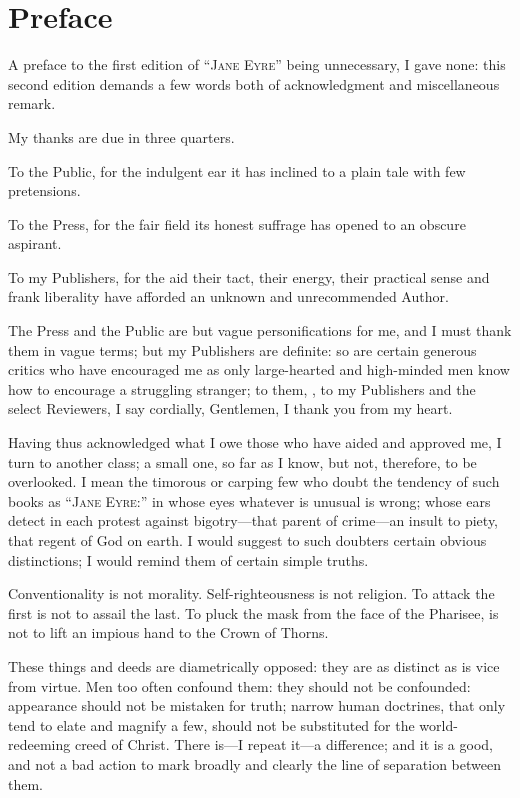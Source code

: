 \chapter{Preface}

A preface to the first edition of \enquote{\textsc{Jane Eyre}} being unnecessary,
I gave none: this second edition demands a few words both of
acknowledgment and miscellaneous remark.

My thanks are due in three quarters.

To the Public, for the indulgent ear it has inclined to a plain tale
with few pretensions.

To the Press, for the fair field its honest suffrage has opened to an
obscure aspirant.

To my Publishers, for the aid their tact, their energy, their practical
sense and frank liberality have afforded an unknown and unrecommended
Author.

The Press and the Public are but vague personifications for me, and I
must thank them in vague terms; but my Publishers are definite: so are
certain generous critics who have encouraged me as only large-hearted
and high-minded men know how to encourage a struggling stranger; to
them, \emph{\ie}, to my Publishers and the select Reviewers, I say
cordially, Gentlemen, I thank you from my heart.

Having thus acknowledged what I owe those who have aided and approved
me, I turn to another class; a small one, so far as I know, but not,
therefore, to be overlooked.  I mean the timorous or carping few who
doubt the tendency of such books as \enquote{\textsc{Jane Eyre:}} in whose eyes
whatever is unusual is wrong; whose ears detect in each protest against
bigotry---that parent of crime---an insult to piety, that regent of God
on earth.  I would suggest to such doubters certain obvious
distinctions; I would remind them of certain simple truths.

Conventionality is not morality.  Self-righteousness is not religion. 
To attack the first is not to assail the last.  To pluck the mask from
the face of the Pharisee, is not to lift an impious hand to the Crown of
Thorns.

These things and deeds are diametrically opposed: they are as distinct
as is vice from virtue.  Men too often confound them: they should not be
confounded: appearance should not be mistaken for truth; narrow human
doctrines, that only tend to elate and magnify a few, should not be
substituted for the world-redeeming creed of Christ.  There is---I
repeat it---a difference; and it is a good, and not a bad action to mark
broadly and clearly the line of separation between them.

